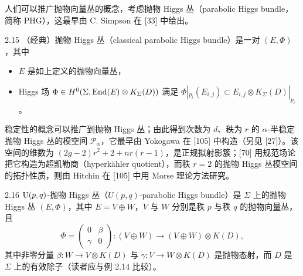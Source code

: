 
人们可以推广抛物向量丛的概念，考虑抛物 Higgs 丛（parabolic Higgs bundle，简称 PHG），这最早由 C. Simpson 在 [33] 中给出。

\begin{defn}{2.15} （经典）抛物 Higgs 丛（classical parabolic Higgs bundle）是一对 $(E,\Phi)$，其中
\begin{itemize}[leftmargin=1.4em,itemsep=1pt,topsep=1pt]
\item $E$ 是如上定义的抛物向量丛，
\item Higgs 场 $\Phi\in H^{0}(\Sigma,\operatorname{End}(E)\otimes K_{\Sigma}(D))$ 满足 $\Phi|_{p_i}(E_{i,j})\subset E_{i,j}\otimes K_{\Sigma}(D)|_{p_i}$。
\end{itemize}
\end{defn}

稳定性的概念可以推广到抛物 Higgs 丛；由此得到次数为 $d$、秩为 $r$ 的 $\alpha$-半稳定抛物 Higgs 丛的模空间 $\mathcal{P}_{\alpha}$，它最早由 Yokogawa 在 [105] 中构造（另见 [27]）。该空间的维数为 $(2g-2)r^{2}+2+nr(r-1)$，是正规拟射影簇；[70] 用规范场论把它构造为超凯勒商（hyperkähler quotient），而秩 $r=2$ 的抛物 Higgs 丛模空间的拓扑性质，则由 Hitchin 在 [105] 中用 Morse 理论方法研究。



\begin{exmp}{2.16} $\mathrm{U}(p,q)$-抛物 Higgs 丛（$U(p,q)$-parabolic Higgs bundle）是 $\Sigma$ 上的抛物 Higgs 丛 $(E,\Phi)$，其中 $E=V\oplus W$，$V$ 与 $W$ 分别是秩 $p$ 与秩 $q$ 的抛物向量丛，且
\[
\Phi=\begin{pmatrix}0&\beta\\ \gamma&0\end{pmatrix} : (V\oplus W)\to(V\oplus W)\otimes K(D),
\]
其中非零分量 $\beta: W\to V\otimes K(D)$ 与 $\gamma: V\to W\otimes K(D)$ 是抛物态射，而 $D$ 是 $\Sigma$ 上的有效除子（读者应与例 2.14 比较）。\end{exmp}

